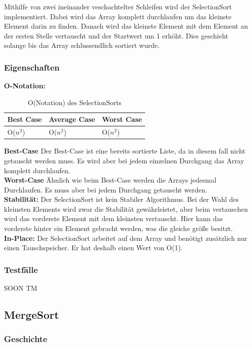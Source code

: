 \documentclass{article}
\begin{document}
Mithilfe von zwei ineinander veschachtelter Schleifen wird der SelectionSort implementiert. Dabei wird das Array komplett durchlaufen um das kleinste Element darin zu finden. Danach wird das kleinste Element mit dem Element an der ersten Stelle vertauscht und der Startwert um 1 erhöht. Dies geschieht solange bis das Array schlussendlich sortiert wurde.
\subsubsection{Eigenschaften}
\textbf{O-Notation:}
\begin{table}[h]
\centering
\begin{tabular}{lll}
	\hline
	\textbf{Best Case} & \textbf{Average Case} & \textbf{Worst Case} \\
	\hline
	O($n^{2}$) & O($n^{2}$) & O($n^{2}$) \\
	\hline
\end{tabular}
\caption{O(Notation) des SelectionSorts \cite{ONotationen}}
\label{tab:SelectionSort}
\end{table}

\textbf{Best-Case} Der Best-Case ist eine bereits sortierte Liste, da in diesem fall nicht getauscht werden muss. Es wird aber bei jedem einzelnen Durchgang das Array komplett durchlaufen. \\
\textbf{Worst-Case} Ähnlich wie beim Best-Case werden die Arrays jedesmal Durchlaufen. Es muss aber bei jedem Durchgang getauscht werden.\\
\textbf{Stabilität:} Der SelectionSort ist kein Stabiler Algorithmus. Bei der Wahl des kleinsten Elements wird zwar die Stabilität gewährleistet, aber beim vertauschen wird das vorderste Element mit dem kleinsten vertauscht. Hier kann das vorderste hinter ein Element gebracht werden, was die gleiche größe besitzt.   \\

\textbf{In-Place:}  Der SelectionSort arbeitet auf dem Array und benötigt zusätzlich nur einen Tauschspeicher. Er hat deshalb einen Wert von O(1). \\
\subsubsection{Testfälle}
SOON TM

\subsection{MergeSort}
\subsubsection{Geschichte}
\end{document}
